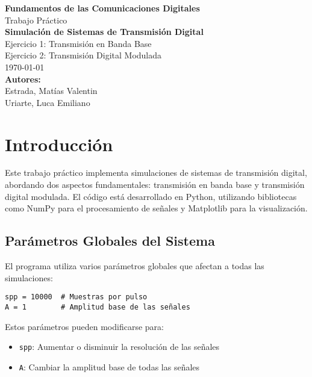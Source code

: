 \documentclass[12pt,a4paper]{article}
\begin{document}
\begin{titlepage}
    \begin{center}
        \vspace*{2cm}
        {\LARGE\textbf{Fundamentos de las Comunicaciones Digitales}}\\[1cm]
        {\Large Trabajo Práctico}\\[4cm]
        {\large\textbf{Simulación de Sistemas de Transmisión Digital}}\\[1cm]
        {\large Ejercicio 1: Transmisión en Banda Base}\\
        {\large Ejercicio 2: Transmisión Digital Modulada}\\[4cm]
        {\large\today}\\[2cm]
        {\large\textbf{Autores:}}\\[0.5cm]
        {\large Estrada, Matías Valentin}\\
        {\large Uriarte, Luca Emiliano}
    \end{center}
\end{titlepage}

\tableofcontents
\newpage

\section{Introducción}
Este trabajo práctico implementa simulaciones de sistemas de transmisión digital, abordando dos aspectos fundamentales:
transmisión en banda base y transmisión digital modulada. El código está desarrollado en Python, utilizando bibliotecas
como NumPy para el procesamiento de señales y Matplotlib para la visualización.

\subsection{Parámetros Globales del Sistema}
El programa utiliza varios parámetros globales que afectan a todas las simulaciones:

\begin{lstlisting}[caption=Parámetros globales]
spp = 10000  # Muestras por pulso
A = 1        # Amplitud base de las señales
\end{lstlisting}

Estos parámetros pueden modificarse para:
\begin{itemize}
    \item \texttt{spp}: Aumentar o disminuir la resolución de las señales
    \item \texttt{A}: Cambiar la amplitud base de todas las señales
\end{itemize}
\end{document}
